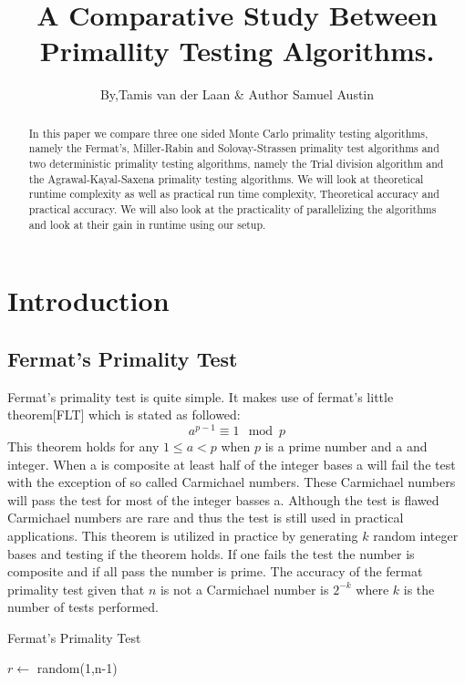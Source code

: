 \documentclass[compressed,final,notitlepage,narroweqnarray,inline,twoside,]{ieee}
\title[TITLE]{A Comparative Study Between Primallity Testing Algorithms.}
\author{By,Tamis van der Laan \& Author Samuel Austin }
\begin{document}
\maketitle

\begin{abstract}
In this paper we compare three one sided Monte Carlo primality testing algorithms, namely the Fermat’s, Miller-Rabin and Solovay-Strassen primality test algorithms and two deterministic primality testing algorithms, namely the Trial division algorithm and the Agrawal-Kayal-Saxena primality testing algorithms.  We will look at theoretical runtime complexity as well as practical run time complexity, Theoretical accuracy and practical accuracy. We will also look at the practicality of parallelizing the algorithms and look at their gain in runtime using our setup.
\end{abstract}
\section{Introduction}
\subsection{Fermat's Primality Test}
Fermat's primality test is quite simple. It makes use of fermat’s little theorem[FLT] which is stated as followed: 
\begin{equation}
a^{p-1} \equiv  1 \mod p
\end{equation}
This theorem holds for any $1\leq a < p$ when $p$ is a prime number and a and integer. When a is composite at least half of the integer bases a will fail the test with the exception of so called Carmichael numbers. These Carmichael numbers will pass the test for most of the integer basses a. Although the test is flawed Carmichael numbers are rare and thus the test is still used in practical applications. This theorem is utilized in practice by generating $k$ random integer bases and testing if the theorem holds. If one fails the test the number is composite and if all pass the number is prime. The accuracy of the fermat primality test given that $n$ is not a Carmichael number is $2^{-k}$ where $k$ is the number of tests performed.
\begin{algorithm}[ht]
 \caption{Fermat's Primality Test}
 {
	$r \longleftarrow$ random(1,n-1) \;
	{
		\;
	}
 }
 \;
\end{algorithm}
\end{document}
